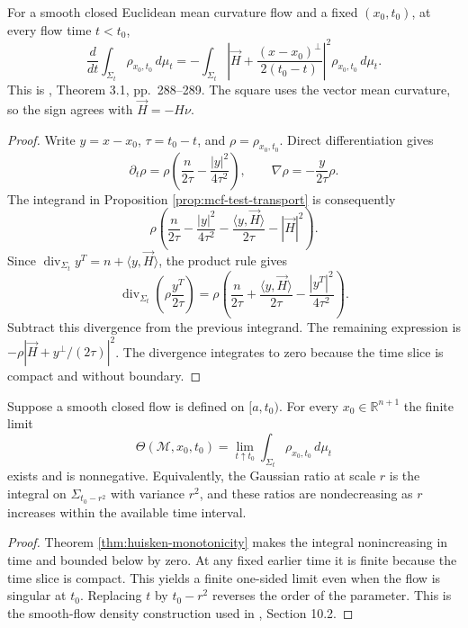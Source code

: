 \begin{theorem}\label{thm:huisken-monotonicity}
For a smooth closed Euclidean mean curvature flow and a fixed $(x_0,t_0)$, at every flow time $t<t_0$,
\[
 \frac{d}{dt}\int_{\Sigma_t}\rho_{x_0,t_0}\,d\mu_t
 =-\int_{\Sigma_t}\left|\vec H+
 \frac{(x-x_0)^\perp}{2(t_0-t)}\right|^2\rho_{x_0,t_0}\,d\mu_t.
\]
This is \cite{Hui90}, Theorem 3.1, pp.~288--289. The square uses the vector mean curvature, so the sign agrees with $\vec H=-H\nu$.
\end{theorem}
\begin{proof}
Write $y=x-x_0$, $\tau=t_0-t$, and $\rho=\rho_{x_0,t_0}$. Direct differentiation gives
\[
 \partial_t\rho=\rho\left(\frac n{2\tau}-\frac{|y|^2}{4\tau^2}\right),
 \qquad \nabla\rho=-\frac{y}{2\tau}\rho.
\]
The integrand in Proposition \ref{prop:mcf-test-transport} is consequently
\[
 \rho\left(\frac n{2\tau}-\frac{|y|^2}{4\tau^2}
 -\frac{\langle y,\vec H\rangle}{2\tau}-|\vec H|^2\right).
\]
Since $\operatorname{div}_{\Sigma_t}y^T=n+\langle y,\vec H\rangle$, the product rule gives
\[
 \operatorname{div}_{\Sigma_t}\left(\rho\frac{y^T}{2\tau}\right)
 =\rho\left(\frac n{2\tau}+\frac{\langle y,\vec H\rangle}{2\tau}
 -\frac{|y^T|^2}{4\tau^2}\right).
\]
Subtract this divergence from the previous integrand. The remaining expression is $-\rho|\vec H+y^\perp/(2\tau)|^2$. The divergence integrates to zero because the time slice is compact and without boundary.
\end{proof}

\begin{corollary}\label{cor:mcf-gaussian-density-limit}
Suppose a smooth closed flow is defined on $[a,t_0)$. For every $x_0\in\mathbb R^{n+1}$ the finite limit
\[
 \Theta(\mathcal M,x_0,t_0)=
 \lim_{t\uparrow t_0}\int_{\Sigma_t}\rho_{x_0,t_0}\,d\mu_t
\]
exists and is nonnegative. Equivalently, the Gaussian ratio at scale $r$ is the integral on $\Sigma_{t_0-r^2}$ with variance $r^2$, and these ratios are nondecreasing as $r$ increases within the available time interval.
\end{corollary}
\begin{proof}
Theorem \ref{thm:huisken-monotonicity} makes the integral nonincreasing in time and bounded below by zero. At any fixed earlier time it is finite because the time slice is compact. This yields a finite one-sided limit even when the flow is singular at $t_0$. Replacing $t$ by $t_0-r^2$ reverses the order of the parameter. This is the smooth-flow density construction used in \cite{WhiMCF15}, Section 10.2.
\end{proof}

